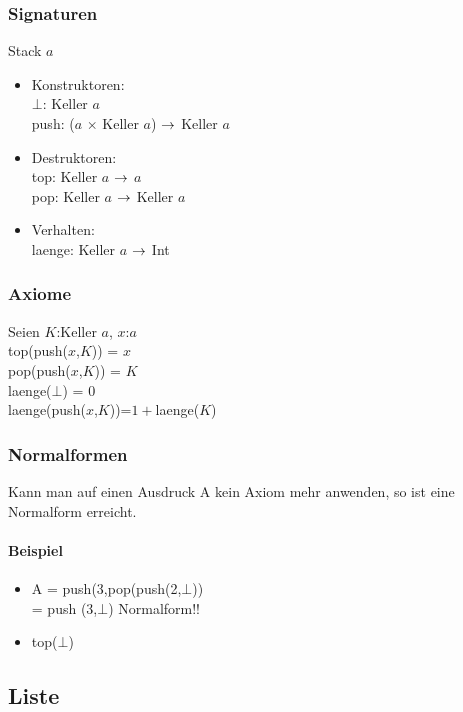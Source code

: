 \documentclass[a4paper,twoside,DIV15,BCOR12mm]{scrbook}
\begin{document}
\subsubsection*{Signaturen}
Stack $a$
\begin{itemize}
	\item Konstruktoren:\\
$\bot$: Keller $a$\\
push: ($a$ $\times$ Keller $a$) $\rightarrow$ Keller $a$\\
	\item Destruktoren:\\
top: Keller $a$ $\rightarrow$ $a$\\
pop: Keller $a$ $\rightarrow$ Keller $a$\\
	\item Verhalten:\\
laenge: Keller $a$ $\rightarrow$ Int\\
\end{itemize}
\subsubsection*{Axiome}
Seien $K$:Keller $a$, $x$:$a$\\
top(push($x$,$K$)) = $x$\\
pop(push($x$,$K$)) = $K$\\
laenge($\bot$)   = $0$\\
laenge(push($x$,$K$))=$1+$laenge($K$)\\

\subsubsection*{Normalformen}
Kann man auf einen Ausdruck A kein Axiom mehr anwenden, so ist eine Normalform erreicht.
	\paragraph{Beispiel}
	\begin{itemize}
		\item 
A = push(3,pop(push(2,$\bot$))\\
 = push (3,$\bot$) Normalform!!
		\item	top($\bot$)
	\end{itemize}
\subsection{Liste}
\end{document}
